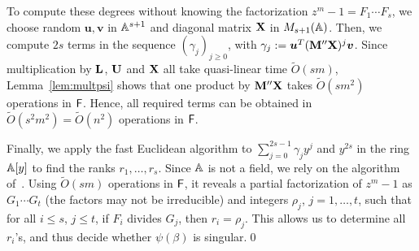   To compute these degrees without knowing the factorization $z^m-1 =
  F_1 \cdots F_s$, we choose random $\boldsymbol{u}, \boldsymbol{v}$
  in $\mathbb{A}^{s+1}$ and diagonal matrix $\mat X$ in $M_{s+1}(\mathbb{A})$.  Then,
  we compute $2s$ terms in the sequence $(\gamma_j)_{j\ge 0}$, with
  $\gamma_j:=\boldsymbol{u}^T (\mat M'' \mat X)^j
  \boldsymbol{v}$. Since multiplication by $\mat L$, $\mat U$ and
  $\mat X$ all take quasi-linear time $\tilde{O}(sm)$,
  Lemma~\ref{lem:multpsi} shows that one product by $\mat M'' \mat X$
  takes $\tilde{O}(sm^2)$ operations in ${\mathsf{F}}$. Hence, all required
  terms can be obtained in $\tilde{O}(s^2m^2)=\tilde{O}(n^2)$
  operations in ${\mathsf{F}}$.

  Finally, we apply the fast Euclidean algorithm to $\sum_{j=0}^{2s-1}
  \gamma_j y^j$ and $y^{2s}$ in the ring $\mathbb{A}[y]$ to find the ranks
  $r_1,\dots,r_s$.  Since $\mathbb{A}$ is not a field, we rely on the
  algorithm of~\cite{AcCoMa03,DaMMMScXi06}. Using $\tilde{O}(sm)$
  operations in ${\mathsf{F}}$, it reveals a partial factorization of $z^m-1$ as
  $G_1 \cdots G_t$ (the factors may not be irreducible) and integers
  $\rho_j$, $j=1,\dots,t$, such that for all $i \le s$, $j\le t$, if
  $F_i$ divides $G_j$, then $r_i=\rho_j$. This allows us to determine all
  $r_i$'s, and thus decide whether $\psi(\beta)$ is singular.\qed






